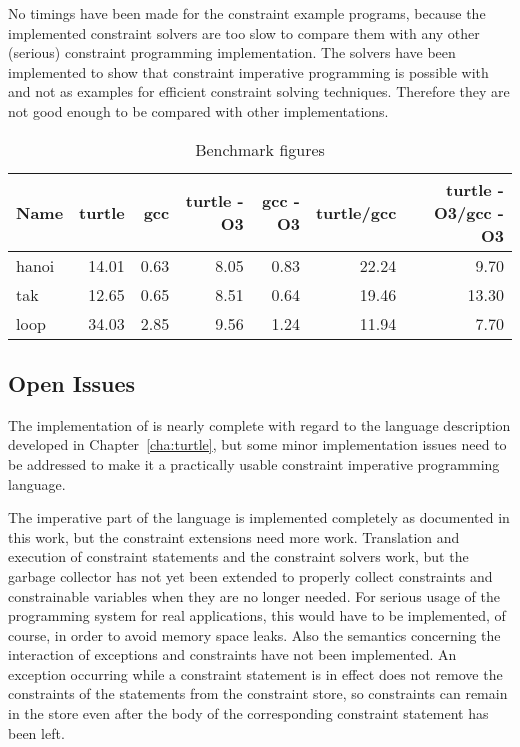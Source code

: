 No timings have been made for the constraint example programs, because
the implemented constraint solvers are too slow to compare them with
any other (serious) constraint programming implementation.  The
solvers have been implemented to show that constraint imperative
programming is possible with \turtle{} and not as examples for
efficient constraint solving techniques.  Therefore they are not good
enough to be compared with other implementations.

\begin{table}
\begin{center}
\begin{tabular}{|l|r|r|r|r|r|r|}
\hline
Name & turtle & gcc & turtle -O3 & gcc -O3 & turtle/gcc & turtle -O3/gcc -O3 \\
\hline\hline
hanoi & 14.01 & 0.63 & 8.05 & 0.83 & 22.24 & 9.70 \\
\hline
tak & 12.65 & 0.65 & 8.51 & 0.64 & 19.46 & 13.30 \\
\hline
loop & 34.03 & 2.85 & 9.56 & 1.24 & 11.94 & 7.70 \\
\hline
\end{tabular}
\end{center}
\caption{Benchmark figures}
\label{tab:benchmark}
\end{table}

\subsection{Open Issues}

The implementation of \turtle{} is nearly complete with regard to the
language description developed in Chapter~\ref{cha:turtle}, but some
minor implementation issues need to be addressed to make it a
practically usable constraint imperative programming language.

The imperative part of the language is implemented completely as
documented in this work, but the constraint extensions need more work.
Translation and execution of constraint statements and the constraint
solvers work, but the garbage collector has not yet been extended to
properly collect constraints and constrainable variables when they are
no longer needed.  For serious usage of the programming system for
real applications, this would have to be implemented, of course, in
order to avoid memory space leaks.  Also the semantics concerning the
interaction of exceptions and constraints have not been implemented.
An exception occurring while a constraint statement is in effect does
not remove the constraints of the statements from the constraint
store, so constraints can remain in the store even after the body of
the corresponding constraint statement has been left.

